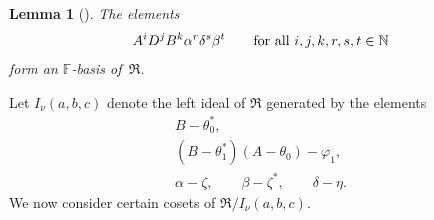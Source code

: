 \documentclass[11pt]{article}
\numberwithin{equation}{section}
\def\N{\mathbb N}
\def\F{\mathbb F}
\numberwithin{equation}{section}
\newtheorem{Lemma}[Theorem]{Lemma}
\begin{document}
\begin{Lemma}[{\cite[Theorem 5.1]{SH:2017-1}}]\label{lem:basisURA}
The elements
\begin{gather*}
A^i D^j B^k \alpha^r \delta^s \beta^t\qquad \hbox{for all $i,j,k,r,s,t\in \N$}\label{eq:basisURA}
\end{gather*}
form an $\F$-basis of~$\Re$.
\end{Lemma}

Let $I_\nu(a,b,c)$ denote the left ideal of $\Re$ generated by the elements
\begin{gather}
B-\theta_0^*,\label{U1}\\
(B-\theta_1^*)(A-\theta_0)-\varphi_1,\label{U2}\\
\alpha-\zeta,\qquad\beta-\zeta^*,\qquad\delta-\eta.
\label{U3}
\end{gather}
We now consider certain cosets of $\Re/I_\nu(a,b,c)$.
\end{document}
